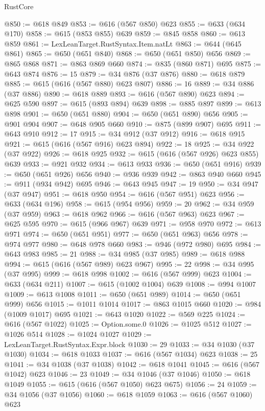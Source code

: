 \begin{lexlean}{RustCore}
\begin{coremodule}
@850 := @618 @849
@853 := @616 (@567 @850) @623
@855 := @633 (@634 @170)
@858 := @615 (@853 @855) @639
@859 := @845 @858
@860 := @613 @859
@861 := LexLeanTarget.RustSyntax.Item.natLt
@863 := @644 (@645 @861)
@865 := @650 (@651 @840)
@868 := @650 (@651 @850) @656
@869 := @865 @868
@871 := @863 @869 @660
@874 := @835 (@860 @871) @695
@875 := @643 @874
@876 := 15
@879 := @34 @876 (@37 @876)
@880 := @618 @879
@885 := @615 (@616 (@567 @880) @623 @807)
@886 := 16
@889 := @34 @886 (@37 @886)
@890 := @618 @889
@893 := @616 (@567 @890) @623
@894 := @625 @590
@897 := @615 (@893 @894) @639
@898 := @885 @897
@899 := @613 @898
@901 := @650 (@651 @880)
@904 := @650 (@651 @890) @656
@905 := @901 @904
@907 := @648 @905 @660
@910 := @875 (@899 @907) @695
@911 := @643 @910
@912 := 17
@915 := @34 @912 (@37 @912)
@916 := @618 @915
@921 := @615 (@616 (@567 @916) @623 @894)
@922 := 18
@925 := @34 @922 (@37 @922)
@926 := @618 @925
@932 := @615 (@616 (@567 @926) @623 @855) @639
@933 := @921 @932
@934 := @613 @933
@936 := @650 (@651 @916)
@939 := @650 (@651 @926) @656
@940 := @936 @939
@942 := @863 @940 @660
@945 := @911 (@934 @942) @695
@946 := @643 @945
@947 := 19
@950 := @34 @947 (@37 @947)
@951 := @618 @950
@954 := @616 (@567 @951) @623
@956 := @633 (@634 @196)
@958 := @615 (@954 @956)
@959 := 20
@962 := @34 @959 (@37 @959)
@963 := @618 @962
@966 := @616 (@567 @963) @623
@967 := @625 @595
@970 := @615 (@966 @967) @639
@971 := @958 @970
@972 := @613 @971
@974 := @650 (@651 @951)
@977 := @650 (@651 @963) @656
@978 := @974 @977
@980 := @648 @978 @660
@983 := @946 (@972 @980) @695
@984 := @643 @983
@985 := 21
@988 := @34 @985 (@37 @985)
@989 := @618 @988
@994 := @615 (@616 (@567 @989) @623 @967)
@995 := 22
@998 := @34 @995 (@37 @995)
@999 := @618 @998
@1002 := @616 (@567 @999) @623
@1004 := @633 (@634 @211)
@1007 := @615 (@1002 @1004) @639
@1008 := @994 @1007
@1009 := @613 @1008
@1011 := @650 (@651 @989)
@1014 := @650 (@651 @999) @656
@1015 := @1011 @1014
@1017 := @863 @1015 @660
@1020 := @984 (@1009 @1017) @695
@1021 := @643 @1020
@1022 := @569 @225
@1024 := @616 (@567 @1022)
@1025 := Option.some.{0}
@1026 := @1025 @512
@1027 := @1026 @514
@1028 := @1024 @1027
@1029 := LexLeanTarget.RustSyntax.Expr.block
@1030 := 29
@1033 := @34 @1030 (@37 @1030)
@1034 := @618 @1033
@1037 := @616 (@567 @1034) @623
@1038 := 25
@1041 := @34 @1038 (@37 @1038)
@1042 := @618 @1041
@1045 := @616 (@567 @1042) @623
@1046 := 23
@1049 := @34 @1046 (@37 @1046)
@1050 := @618 @1049
@1055 := @615 (@616 (@567 @1050) @623 @675)
@1056 := 24
@1059 := @34 @1056 (@37 @1056)
@1060 := @618 @1059
@1063 := @616 (@567 @1060) @623

\end{coremodule}
\end{lexlean}

